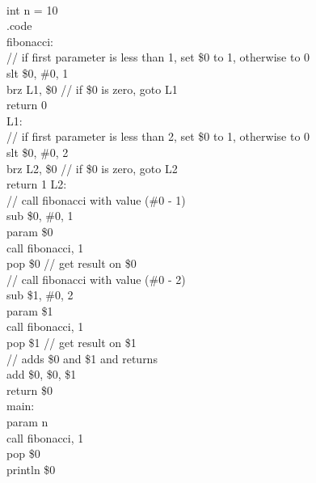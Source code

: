 \documentclass[12pt,a4paper,extrafontsizes,article]{memoir}
\newcommand*{\srcfont}{\fontfamily{pcr}\selectfont}
\begin{document}
{\srcfont\footnotesize
{}\\
{\color{blue}int} n = {\color{orange}10}\\
{\color{gray}.code}\\
{\color{red}fibonacci:}\\
{\color{green!50!black}// if first parameter is less than 1, set \$0 to 1, otherwise to 0}\\
{\color{violet}slt} \$0, \#0, {\color{orange}1}\\
{\color{violet}brz} L1, \$0 {\color{green!50!black}// if \$0 is zero, goto L1}\\
{\color{violet}return} {\color{orange}0}\\
{\color{red}L1:}\\
{\color{green!50!black}// if first parameter is less than 2, set \$0 to 1, otherwise to 0}\\
{\color{violet}slt} \$0, \#0, {\color{orange}2}\\
{\color{violet}brz} L2, \$0 {\color{green!50!black}// if \$0 is zero, goto L2}\\
{\color{violet}return {\color{orange}1}}
{\color{red}L2:}\\
{\color{green!50!black}// call fibonacci with value (\#0 - 1)}\\
{\color{violet}sub} \$0, \#0, {\color{orange}1}\\ 
{\color{violet}param} \$0\\
{\color{violet}call} fibonacci, {\color{orange}1}\\
{\color{violet}pop} \$0 {\color{green!50!black}// get result on \$0}\\
{\color{green!50!black}// call fibonacci with value (\#0 - 2)}\\
{\color{violet}sub} \$1, \#0, {\color{orange}2}\\
{\color{violet}param} \$1\\
{\color{violet}call} fibonacci, {\color{orange}1}\\
pop \$1 {\color{green!50!black}// get result on \$1}\\
{\color{green!50!black}// adds \$0 and \$1 and returns}\\
{\color{violet}add} \$0, \$0, \$1\\
{\color{violet}return} \$0\\
{\color{red}main:}\\
{\color{violet}param} n\\
{\color{violet}call} fibonacci, {\color{orange}1}\\
{\color{violet}pop} \$0\\
{\color{violet}println} \$0\\
}
\end{document}

